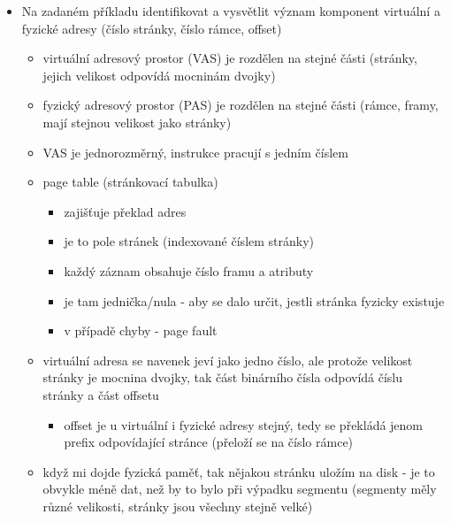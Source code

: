 \begin{itemize}
\begin{itemize}
\item převod paměti je transparentní
\item výhody konceptu
\begin{itemize}
\item větší adresový prostor - abych mohl spustit proces s většími požadavky na paměť
\item bezpečnost - aby si procesy navzájem nemohly koukat do paměti, každý má vlastní mapování; to je dnes ten hlavní důvod
\end{itemize}
\end{itemize}
\item Na zadaném příkladu identifikovat a vysvětlit význam komponent virtuální a fyzické adresy (číslo stránky, číslo rámce, offset)
\begin{itemize}
\item virtuální adresový prostor (VAS) je rozdělen na stejné části (stránky, jejich velikost odpovídá mocninám dvojky)
\item fyzický adresový prostor (PAS) je rozdělen na stejné části (rámce, framy, mají stejnou velikost jako stránky)
\item VAS je jednorozměrný, instrukce pracují s jedním číslem
\item page table (stránkovací tabulka)
\begin{itemize}
\item zajišťuje překlad adres
\item je to pole stránek (indexované číslem stránky)
\item každý záznam obsahuje číslo framu a atributy
\item je tam jednička/nula - aby se dalo určit, jestli stránka fyzicky existuje
\item v případě chyby - page fault
\end{itemize}
\item virtuální adresa se navenek jeví jako jedno číslo, ale protože velikost stránky je mocnina dvojky, tak část binárního čísla odpovídá číslu stránky a část offsetu
\begin{itemize}
\item offset je u virtuální i fyzické adresy stejný, tedy se překládá jenom prefix odpovídající stránce (přeloží se na číslo rámce)
\end{itemize}
\item když mi dojde fyzická paměť, tak nějakou stránku uložím na disk - je to obvykle méně dat, než by to bylo při výpadku segmentu (segmenty měly různé velikosti, stránky jsou všechny stejně velké)

\end{itemize}
\end{itemize}
